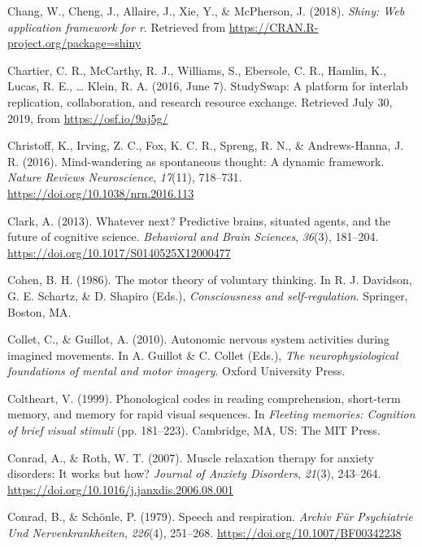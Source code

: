 \documentclass[a4paper,12pt,twoside,onecolumn,openright,final,oldfontcommands]{memoir}
\begin{document}
\leavevmode\hypertarget{ref-R-shiny}{}%
Chang, W., Cheng, J., Allaire, J., Xie, Y., \& McPherson, J. (2018). \emph{Shiny: Web application framework for r}. Retrieved from \url{https://CRAN.R-project.org/package=shiny}

\leavevmode\hypertarget{ref-chartier_studyswap_2016}{}%
Chartier, C. R., McCarthy, R. J., Williams, S., Ebersole, C. R., Hamlin, K., Lucas, R. E., \ldots{} Klein, R. A. (2016, June 7). StudySwap: A platform for interlab replication, collaboration, and research resource exchange. Retrieved July 30, 2019, from \url{https://osf.io/9aj5g/}

\leavevmode\hypertarget{ref-christoff_mind-wandering_2016}{}%
Christoff, K., Irving, Z. C., Fox, K. C. R., Spreng, R. N., \& Andrews-Hanna, J. R. (2016). Mind-wandering as spontaneous thought: A dynamic framework. \emph{Nature Reviews Neuroscience}, \emph{17}(11), 718--731. \url{https://doi.org/10.1038/nrn.2016.113}

\leavevmode\hypertarget{ref-clark_whatever_2013}{}%
Clark, A. (2013). Whatever next? Predictive brains, situated agents, and the future of cognitive science. \emph{Behavioral and Brain Sciences}, \emph{36}(3), 181--204. \url{https://doi.org/10.1017/S0140525X12000477}

\leavevmode\hypertarget{ref-cohen_motor_1986}{}%
Cohen, B. H. (1986). The motor theory of voluntary thinking. In R. J. Davidson, G. E. Schartz, \& D. Shapiro (Eds.), \emph{Consciousness and self-regulation}. Springer, Boston, MA.

\leavevmode\hypertarget{ref-collet_autonomic_2010}{}%
Collet, C., \& Guillot, A. (2010). Autonomic nervous system activities during imagined movements. In A. Guillot \& C. Collet (Eds.), \emph{The neurophysiological foundations of mental and motor imagery}. Oxford University Press.

\leavevmode\hypertarget{ref-coltheart_phonological_1999}{}%
Coltheart, V. (1999). Phonological codes in reading comprehension, short-term memory, and memory for rapid visual sequences. In \emph{Fleeting memories: Cognition of brief visual stimuli} (pp. 181--223). Cambridge, MA, US: The MIT Press.

\leavevmode\hypertarget{ref-conrad_muscle_2007}{}%
Conrad, A., \& Roth, W. T. (2007). Muscle relaxation therapy for anxiety disorders: It works but how? \emph{Journal of Anxiety Disorders}, \emph{21}(3), 243--264. \url{https://doi.org/10.1016/j.janxdis.2006.08.001}

\leavevmode\hypertarget{ref-conrad_speech_1979}{}%
Conrad, B., \& Schönle, P. (1979). Speech and respiration. \emph{Archiv Für Psychiatrie Und Nervenkrankheiten}, \emph{226}(4), 251--268. \url{https://doi.org/10.1007/BF00342238}
\end{document}
